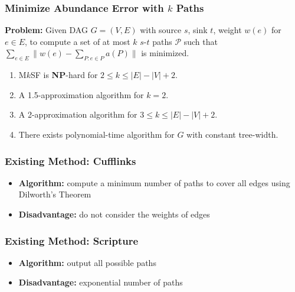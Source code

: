 \frame
{
	\frametitle{Minimize Abundance Error with $k$ Paths}
	{\bf Problem:} Given DAG $G=(V,E)$ with source $s$, sink $t$, weight $w(e)$ for $e\in E$,
		to compute a set of at most $k$ $s$-$t$ paths $\mathcal{P}$ such that
			$\sum_{e\in E} \| w(e) - \sum_{P:e\in P} a(P)\|$ is minimized.

	\vspace{0.3cm}

	\vspace{0.2cm}
	\begin{enumerate}
	\item<3-> {M$k$SF is {\bf NP}-hard for $2\le k \le |E| - |V| + 2$.}
	\vspace{0.1cm}
	\item<4-> A 1.5-approximation algorithm for $k=2$.
	\vspace{0.1cm}
	\item<5-> A 2-approximation algorithm for $3\le k \le |E| - |V| + 2$.
	\vspace{0.1cm}
	\item<6-> There exists polynomial-time algorithm for $G$ with constant tree-width.
	\end{enumerate}
}

\frame
{
	\frametitle{Existing Method: Cufflinks}

	\begin{itemize}
	\item {\bf Algorithm:} compute a minimum number of paths to cover all edges using Dilworth's Theorem
	\vspace{0.5cm}
	\item {\bf Disadvantage:} do not consider the weights of edges
	\end{itemize}
}

\frame
{
	\frametitle{Existing Method: Scripture}
	\begin{itemize}
	\item {\bf Algorithm:} output all possible paths
	\vspace{0.5cm}
	\item {\bf Disadvantage:} exponential number of paths
	\end{itemize}
}


